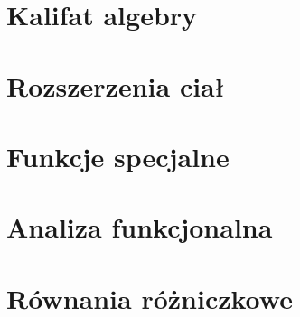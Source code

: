 \chapter{Kalifat algebry}
	
	
	
	
	
	
	
	

\chapter{Rozszerzenia ciał}
	

\chapter{Funkcje specjalne\label{parum}}





\chapter{Analiza funkcjonalna}

\chapter{Równania różniczkowe}
	

